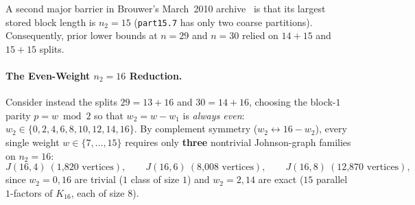 \documentclass[11pt,letterpaper]{article}
\theoremstyle{plain}
\theoremstyle{definition}
\theoremstyle{remark}
\begin{document}
A second major barrier in Brouwer's March~2010 archive~\cite{BrouwerPartitions2010} is that its largest stored block length is $n_2 = 15$ (\texttt{part15.7} has only two coarse partitions). Consequently, prior lower bounds at $n = 29$ and $n = 30$ relied on $14{+}15$ and $15{+}15$ splits.

\paragraph{The Even-Weight $n_2 = 16$ Reduction.}
Consider instead the splits $29 = 13 + 16$ and $30 = 14 + 16$, choosing the block-$1$ parity $p = w \bmod 2$ so that $w_2 = w - w_1$ is \emph{always even}: $w_2 \in \{0, 2, 4, 6, 8, 10, 12, 14, 16\}$. By complement symmetry ($w_2 \leftrightarrow 16 - w_2$), every single weight $w \in \{7, \dots, 15\}$ requires only \textbf{three} nontrivial Johnson-graph families on $n_2 = 16$:
\[
J(16, 4)\ (\text{1,820 vertices}), \qquad
J(16, 6)\ (\text{8,008 vertices}), \qquad
J(16, 8)\ (\text{12,870 vertices}),
\]
since $w_2 = 0, 16$ are trivial ($1$ class of size $1$) and $w_2 = 2, 14$ are exact ($15$ parallel $1$-factors of $K_{16}$, each of size $8$).
\end{document}

